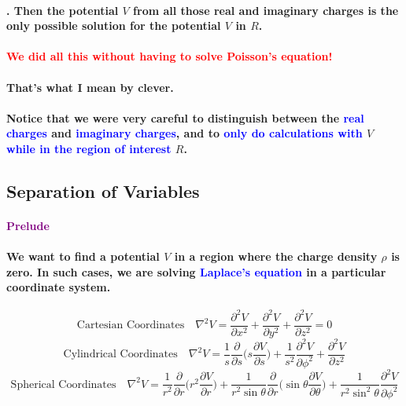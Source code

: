 \documentclass{article}
\begin{document}
\paragraph{. Then the potential $V$ from all those real and imaginary charges is the only possible solution for the potential $V$ in $R$.}
\paragraph{\textcolor{red}{We did all this without having to solve Poisson's equation!}}
\paragraph{That's what I mean by clever.}
\paragraph{Notice that we were very careful to distinguish between the \textcolor{blue}{real charges} and \textcolor{blue}{imaginary charges}, and to \textcolor{blue}{only do calculations with} $V$ \textcolor{blue}{while in the region of interest} $R$.}
\subsection{Separation of Variables}
\paragraph{\textcolor{purple}{Prelude}}
\paragraph{We want to find a potential $V$ in a region where the charge density $\rho$ is zero. In such cases, we are solving \textcolor{blue}{Laplace's equation} in a particular coordinate system.}
\begin{equation*}
    \text{Cartesian Coordinates} \quad \nabla^2V=\frac{\partial^2 V}{\partial x^2}+\frac{\partial^2 V}{\partial y^2}+\frac{\partial^2 V}{\partial z^2}=0
\end{equation*}
\begin{equation*}
    \text{Cylindrical Coordinates}\quad \nabla^2V=\frac{1}{s}\frac{\partial}{\partial s}\bigg(s\frac{\partial V}{\partial s}\bigg)+\frac{1}{s^2}\frac{\partial^2 V}{\partial \phi^2}+\frac{\partial^2V}{\partial z^2}
\end{equation*}
\begin{equation*}
    \text{Spherical Coordinates}\quad \nabla^2V=\frac{1}{r^2}\frac{\partial}{\partial r}\bigg(r^2\frac{\partial V}{\partial r}\bigg) +\frac{1}{r^2\sin\theta}\frac{\partial}{\partial r}\bigg( \sin\theta\frac{\partial V}{\partial \theta}\bigg)+\frac{1}{r^2\sin^2\theta}\frac{\partial^2V}{\partial\phi^2}
\end{equation*}
\end{document}

